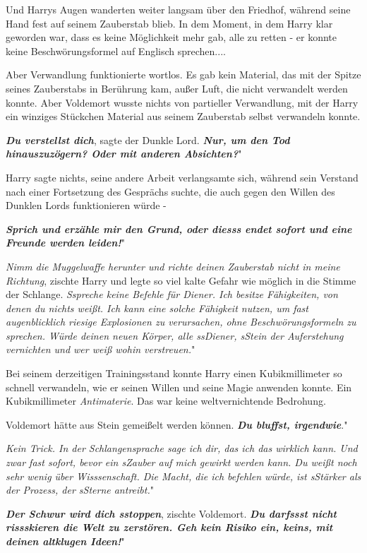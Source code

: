 Und Harrys Augen wanderten weiter langsam über den Friedhof, während seine Hand
fest auf seinem Zauberstab blieb. In dem Moment, in dem Harry klar geworden war,
dass es keine Möglichkeit mehr gab, alle zu retten - er konnte keine
Beschwörungsformel auf Englisch sprechen....

Aber Verwandlung funktionierte wortlos. Es gab kein Material, das mit der Spitze
seines Zauberstabs in Berührung kam, außer Luft, die nicht verwandelt werden
konnte. Aber Voldemort wusste nichts von partieller Verwandlung, mit der Harry
ein winziges Stückchen Material aus seinem Zauberstab selbst verwandeln konnte.

\glqq \textbf{\emph{Du verstellst dich}}\grqq{}, sagte der Dunkle Lord. \glqq
\textbf{\emph{Nur, um den Tod hinauszuzögern? Oder mit anderen Absichten?}}"

Harry sagte nichts, seine andere Arbeit verlangsamte sich, während sein Verstand
nach einer Fortsetzung des Gesprächs suchte, die auch gegen den Willen des
Dunklen Lords funktionieren würde -

\glqq \textbf{\emph{Sprich und erzähle mir den Grund, oder diesss endet sofort
und eine Freunde werden leiden!}}"

\glqq \emph{Nimm die Muggelwaffe herunter und richte deinen Zauberstab nicht in
meine Richtung}\grqq{}, zischte Harry und legte so viel kalte Gefahr wie möglich
in die Stimme der Schlange. \glqq \emph{Sspreche keine Befehle für Diener. Ich
besitze Fähigkeiten, von denen du nichts weißt. Ich kann eine solche Fähigkeit
nutzen, um fast augenblicklich riesige Explosionen zu verursachen, ohne
Beschwörungsformeln zu sprechen. Würde deinen neuen Körper, alle ssDiener,
sStein der Auferstehung vernichten und wer weiß wohin verstreuen.}"

Bei seinem derzeitigen Trainingsstand konnte Harry einen Kubikmillimeter so
schnell verwandeln, wie er seinen Willen und seine Magie anwenden konnte. Ein
Kubikmillimeter \emph{Antimaterie}. Das war keine weltvernichtende Bedrohung.

Voldemort hätte aus Stein gemeißelt werden können. \glqq \textbf{\emph{Du
bluffst, irgendwie}}."

\glqq \emph{Kein Trick. In der Schlangensprache sage ich dir, das ich das
wirklich kann. Und zwar fast sofort, bevor ein sZauber auf mich gewirkt werden
kann. Du weißt noch sehr wenig über Wisssenschaft. Die Macht, die ich befehlen
würde, ist sStärker als der Prozess, der sSterne antreibt.}"

\glqq \textbf{\emph{Der Schwur wird dich sstoppen}}\grqq{}, zischte Voldemort.
\glqq \textbf{\emph{Du darfssst nicht rissskieren die Welt zu zerstören. Geh
kein Risiko ein, keins, mit deinen altklugen Ideen!}}"

